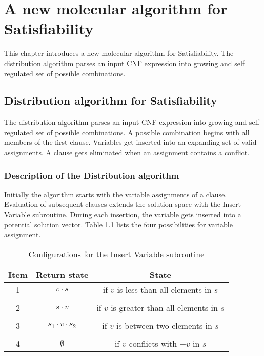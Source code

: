 
\chapter{A new molecular algorithm for {\sc Satisfiability}}

This chapter introduces a new molecular algorithm for {\sc Satisfiability}.  The distribution algorithm parses an input CNF expression into growing and self regulated set of possible combinations.
\section{Distribution algorithm for {\sc Satisfiability}}

The distribution algorithm parses an input CNF expression into growing and self regulated set of possible combinations.  A possible combination begins with all members of the first clause.  Variables get inserted into an expanding set of valid assignments.  A clause gets eliminated when an assignment contains a conflict.
	\subsection{Description of the Distribution algorithm}
		
		
Initially the algorithm starts with the variable assignments of a clause.  Evaluation of subsequent clauses extends the solution space with the {\sc Insert Variable} subroutine.  During each insertion, the variable gets inserted into a potential solution vector.  Table \ref{distributionInsertTable} lists the four possibilities for variable assignment.

\begin{table}[htdp]
\caption{Configurations for the {\sc Insert Variable} subroutine}
\begin{center}
\begin{tabular}{|c|c|c|}
\hline
Item & Return state & State \\ \hline 
1	& $v \cdot s$ & if $v$ is less than all elements in $s$ \\ 
& &  \\ \hline
2	& $s \cdot v$ & if $v$ is greater than all elements in $s$ \\ 
& &  \\ \hline
3	& $s_1 \cdot v \cdot s_2$ & if $v$ is between two elements in $s$ \\ 
& &  \\ \hline
4	& $\emptyset$ & if $v$ conflicts with $-v$ in $s$\\ \hline
\end{tabular}
\end{center}
\label{distributionInsertTable}
\end{table}%

